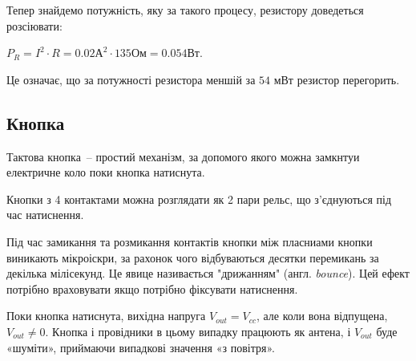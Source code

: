 \documentclass[12pt,a4paper]{book}  %
\begin{document}
Тепер знайдемо потужність, яку за такого процесу, резистору доведеться розсіювати:

$P_R = I^2 \cdot R = 0.02 \text{А}^2 \cdot 135 \text{Ом} = 0.054 \text{Вт}$.

Це означає, що за потужності резистора меншій за $54$ мВт резистор перегорить.


\subsection{Кнопка}
Тактова кнопка~-- простий механізм, за допомого якого можна замкнтуи електричне коло поки кнопка натиснута.

\begin{figure}[h!]
\label{ris:image}
\end{figure}

Кнопки з 4 контактами можна розглядати як 2 пари рельс, що з'єднуються під час натиснення.



Під час замикання та розмикання контактів кнопки між пласниами кнопки виникають мікроіскри, за рахонок чого відбуваються десятки перемикань за декілька мілісекунд. Це явице називається "дрижанням" (англ. \textit{bounce}). Цей ефект потрібно враховувати якщо потрібно фіксувати натиснення.

Поки кнопка натиснута, вихідна напруга $V_{out} = V_{cc}$, але коли вона відпущена, $V_{out} \neq 0$. Кнопка і провідники в цьому випадку працюють як антена, і $V_{out}$ буде «шуміти», приймаючи випадкові значення «з повітря».
\end{document}

